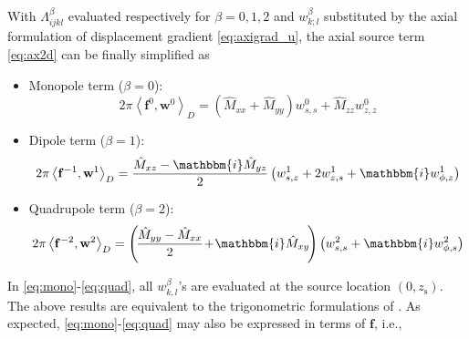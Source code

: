 \documentclass[extra]{gji}
\begin{document}
With $\Lambda_{ijkl}^\beta$ evaluated respectively for $\beta=0,1,2$ and 
$w_{k;l}^\beta$ substituted by the axial formulation of displacement 
gradient \eqref{eq:axigrad_u}, the axial source term
\eqref{eq:ax2d} can be finally simplified as 
\begin{itemize}
  \item Monopole term ($\beta=0$):
  \begin{equation} 
    2\pi \left\langle \mathbf{f}^{0},\mathbf{w}^0 \right\rangle _{D}=
    \left(\hat{M}_{xx}+\hat{M}_{yy}\right)w_{s,s}^0+\hat{M}_{zz}w_{z,z}^0
    \label{eq:mono}
  \end{equation}
  \item Dipole term ($\beta=1$):
  \begin{equation} 
    2\pi \left\langle \mathbf{f}^{-1},\mathbf{w}^1 \right\rangle _{D}=
    \frac{\hat{M}_{xz}-\mathbbm{i}\hat{M}_{yz}}{2} 
    \left(w_{s,z}^1+2w_{z,s}^1+\mathbbm{i}w_{\phi,z}^1\right)
    \label{eq:di}
  \end{equation}
  \item Quadrupole term ($\beta=2$):
  \begin{equation} 
    2\pi \left\langle \mathbf{f}^{-2},\mathbf{w}^2 \right\rangle _{D}=
    \left(\!\frac{\hat{M}_{yy}-\hat{M}_{xx}}{2}\!+\!\mathbbm{i}\hat{M}_{xy}\!\right) 
    \left(w_{s,s}^2+\mathbbm{i}w_{\phi,s}^2\right)
    \label{eq:quad}
  \end{equation}
\end{itemize}
In \eqref{eq:mono}-\eqref{eq:quad}, all $w_{k,l}^\beta$'s are evaluated at 
the source location $\left(0,z_\text{s}\right)$. 
The above results are equivalent to the trigonometric formulations of 
\cite{nissen2007axisem}.
As expected, \eqref{eq:mono}-\eqref{eq:quad} may also be expressed in terms of 
$\mathbf{f}$, i.e.,
\end{document}

